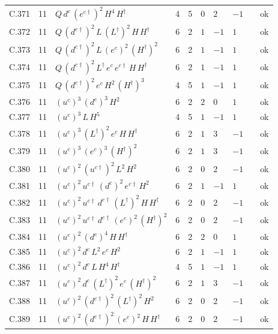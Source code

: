 {\begin{longtable}{@{}ll>{\raggedright\arraybackslash}p{6.4cm}rrllllr@{}}
C.371 & 11 & $Q\,d^c\,(e^{c\dagger})^{2}\,H^{4}\,H^\dagger$ & 4 & 5 & $0$ & $2$ & $-1$ &  & ok \\
C.372 & 11 & $Q\,(d^{c\dagger})^{2}\,L\,(L^\dagger)^{2}\,H\,H^\dagger$ & 6 & 2 & $1$ & $-1$ & $1$ &  & ok \\
C.373 & 11 & $Q\,(d^{c\dagger})^{2}\,L\,(e^c)^{2}\,(H^\dagger)^{2}$ & 6 & 2 & $1$ & $-1$ & $1$ &  & ok \\
C.374 & 11 & $Q\,(d^{c\dagger})^{2}\,L^\dagger\,e^c\,e^{c\dagger}\,H\,H^\dagger$ & 6 & 2 & $1$ & $-1$ & $1$ &  & ok \\
C.375 & 11 & $Q\,(d^{c\dagger})^{2}\,e^c\,H^{2}\,(H^\dagger)^{3}$ & 4 & 5 & $1$ & $-1$ & $1$ &  & ok \\
C.376 & 11 & $(u^c)^{3}\,(d^c)^{3}\,H^{2}$ & 6 & 2 & $2$ & $0$ & $1$ &  & ok \\
C.377 & 11 & $(u^c)^{3}\,L\,H^{5}$ & 4 & 5 & $1$ & $-1$ & $1$ &  & ok \\
C.378 & 11 & $(u^c)^{3}\,(L^\dagger)^{2}\,e^c\,H\,H^\dagger$ & 6 & 2 & $1$ & $3$ & $-1$ &  & ok \\
C.379 & 11 & $(u^c)^{3}\,(e^c)^{3}\,(H^\dagger)^{2}$ & 6 & 2 & $1$ & $3$ & $-1$ &  & ok \\
C.380 & 11 & $(u^c)^{2}\,(u^{c\dagger})^{2}\,L^{2}\,H^{2}$ & 6 & 2 & $0$ & $2$ & $-1$ &  & ok \\
C.381 & 11 & $(u^c)^{2}\,u^{c\dagger}\,(d^c)^{2}\,e^{c\dagger}\,H^{2}$ & 6 & 2 & $1$ & $-1$ & $1$ &  & ok \\
C.382 & 11 & $(u^c)^{2}\,u^{c\dagger}\,d^{c\dagger}\,(L^\dagger)^{2}\,H\,H^\dagger$ & 6 & 2 & $0$ & $2$ & $-1$ &  & ok \\
C.383 & 11 & $(u^c)^{2}\,u^{c\dagger}\,d^{c\dagger}\,(e^c)^{2}\,(H^\dagger)^{2}$ & 6 & 2 & $0$ & $2$ & $-1$ &  & ok \\
C.384 & 11 & $(u^c)^{2}\,(d^c)^{4}\,H\,H^\dagger$ & 6 & 2 & $2$ & $0$ & $1$ &  & ok \\
C.385 & 11 & $(u^c)^{2}\,d^c\,L^{2}\,e^c\,H^{2}$ & 6 & 2 & $1$ & $-1$ & $1$ &  & ok \\
C.386 & 11 & $(u^c)^{2}\,d^c\,L\,H^{4}\,H^\dagger$ & 4 & 5 & $1$ & $-1$ & $1$ &  & ok \\
C.387 & 11 & $(u^c)^{2}\,d^c\,(L^\dagger)^{2}\,e^c\,(H^\dagger)^{2}$ & 6 & 2 & $1$ & $3$ & $-1$ &  & ok \\
C.388 & 11 & $(u^c)^{2}\,(d^{c\dagger})^{2}\,(L^\dagger)^{2}\,H^{2}$ & 6 & 2 & $0$ & $2$ & $-1$ &  & ok \\
C.389 & 11 & $(u^c)^{2}\,(d^{c\dagger})^{2}\,(e^c)^{2}\,H\,H^\dagger$ & 6 & 2 & $0$ & $2$ & $-1$ &  & ok \\

\end{longtable}}

